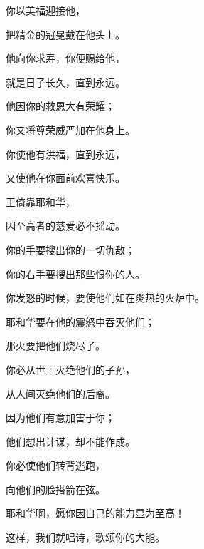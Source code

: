 {\Q {}你以美福迎接他，
\par }{\Q 把精金的冠冕戴在他头上。
\par }{\Q {}他向你求寿，你便赐给他，
\par }{\Q 就是日子长久，直到永远。
\par }{\Q {}他因你的救恩大有荣耀；
\par }{\Q 你又将尊荣威严加在他身上。
\par }{\Q {}你使他有洪福，直到永远，
\par }{\Q 又使他在你面前欢喜快乐。
\par }{\Q {}王倚靠耶和华，
\par }{\Q 因至高者的慈爱必不摇动。
\par }{\BB \par }{\Q {}你的手要搜出你的一切仇敌；
\par }{\Q 你的右手要搜出那些恨你的人。
\par }{\Q {}你发怒的时候，要使他们如在炎热的火炉中。
\par }{\Q 耶和华要在他的震怒中吞灭他们；
\par }{\Q 那火要把他们烧尽了。
\par }{\Q {}你必从世上灭绝他们的子孙，
\par }{\Q 从人间灭绝他们的后裔。
\par }{\Q {}因为他们有意加害于你；
\par }{\Q 他们想出计谋，却不能作成。
\par }{\Q {}你必使他们转背逃跑，
\par }{\Q 向他们的脸搭箭在弦。
\par }{\BB \par }{\Q {}耶和华啊，愿你因自己的能力显为至高！
\par }{\Q 这样，我们就唱诗，歌颂你的大能。

}
